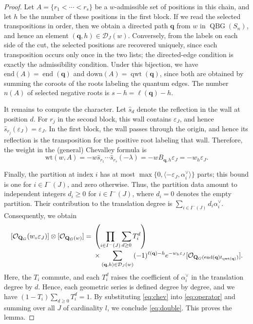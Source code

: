 \documentclass[11pt,a4paper,reqno]{amsart}
\numberwithin{equation}{section}
\theoremstyle{definition}
\DeclareMathOperator{\QBG}{QBG}
\DeclareMathOperator{\End}{end}
\DeclareMathOperator{\qwt}{qwt}
\newcommand{\QG}{\mathbf Q_G}
\newcommand{\OO}{\mathcal O}
\newcommand{\Si}[1]{[\OO_{\QG(#1)}]}
\newcommand{\qq}{\mathbf q}
\newcommand{\eps}{\varepsilon}
\newcommand{\wlong}{w_\circ}
\begin{document}
\begin{proof}
Let \(A=\{r_1<\cdots<r_s\}\) be a \(w\)-admissible set of positions
in this chain, and let \(h\) be the number of these positions in the
first block. If we read the selected transpositions in order, then we obtain a
directed path \(\qq\) from \(w\) in \(\QBG(S_n)\), and hence an element
\((\qq,h)\in\mathcal D_J(w)\). Conversely, from the labels on each side of
the cut, the selected positions are recovered uniquely, since each
transposition occurs only once in the two lists; the directed-edge
condition is exactly the admissibility condition. Under this bijection, we have
\(\mathrm{end}(A)=\End(\qq)\) and \(\mathrm{down}(A)=\qwt(\qq)\),
since both are obtained by summing the coroots of the roots labeling the quantum edges.
The number \(n(A)\) of selected negative roots is \(s-h=\ell(\qq)-h\).

It remains to compute the character. Let \(\widehat s_d\) denote the 
reflection in the wall at position \(d\). For \(r_j\) in the second
block, this wall contains \(\eps_J\), and hence
\(\widehat s_{r_j}(\eps_J)=\eps_J\). In the first block, the wall
passes through the origin, and hence its reflection is the transposition for the positive root 
labeling that wall. Therefore, the weight in the (general) Chevalley formula is 
\[
 \mathrm{wt}(w,A)
 =-w\widehat s_{r_1}\cdots\widehat s_{r_s}(-\lambda)
 =-wB_{\qq,h}\eps_J=-w_h\eps_J.
\]

Finally, the partition at index \(i\) has at most
\(\max\{0,\langle-\eps_J,\alpha_i^\vee\rangle\}\) parts; 
this bound is one for
\(i\in I^-(J)\), and zero otherwise. Thus, the partition data amount to
independent integers \(d_i\ge0\) for \(i\in I^-(J)\), where \(d_i=0\)
denotes the empty partition. Their contribution to the translation
degree is \(\sum_{i\in I^-(J)}d_i\alpha_i^\vee\). Consequently, we obtain 
\begin{equation}\label{eq:chev}
\begin{aligned}
 \relax[\OO_{\QG}(\wlong\eps_J)]\otimes\Si{w}
  ={}&\left(\prod_{i\in I^-(J)}\sum_{d\ge0}T_i^d\right)\\[-2pt]
    &{}\times\sum_{(\qq,h)\in\mathcal D_J(w)}
       (-1)^{\ell(\qq)-h}e^{-w_h\eps_J}
       \Si{\End(\qq)t_{\qwt(\qq)}} .
\end{aligned}
\end{equation}
Here, the \(T_i\) commute, and each \(T_i^d\) raises the coefficient of
\(\alpha_i^\vee\) in the translation degree by \(d\). Hence, each
geometric series is defined degree by degree, and we have 
\((1-T_i)\sum_{d\ge0}T_i^d=1\). By substituting \eqref{eq:chev} into
\eqref{eq:operator} and summing over all \(J\) of cardinality \(l\),
we conclude \eqref{eq:double}. This proves the lemma. 
\end{proof}
\end{document}
